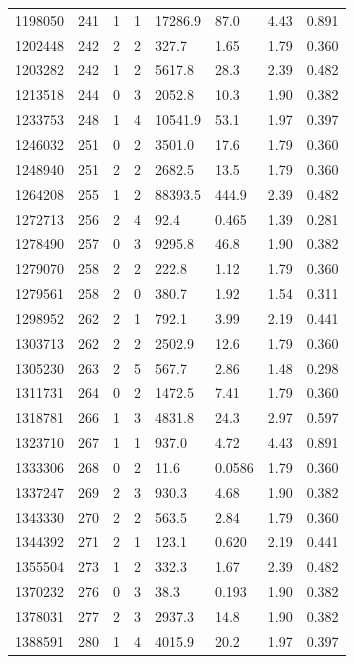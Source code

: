 \documentclass[preview]{standalone}
\begin{document}
{{{{\begin{tabular}{L{1.2cm}C{1.2cm} C{0.3cm}C{0.5cm} C{1.4cm}C{1.4cm} C{1.4cm}C{1.4cm}}
  1198050  &   241  & 1     &  1 &  17286.9  & 87.0  & 4.43 &  0.891   \\ 
  1202448  &   242  & 2     &  2 &  327.7  & 1.65  & 1.79 &  0.360   \\ 
  1203282  &   242  & 1     &  2 &  5617.8  & 28.3  & 2.39 &  0.482   \\ 
  1213518  &   244  & 0     &  3 &  2052.8  & 10.3  & 1.90 &  0.382   \\ 
  1233753  &   248  & 1     &  4 &  10541.9  & 53.1  & 1.97 &  0.397   \\ 
  1246032  &   251  & 0     &  2 &  3501.0  & 17.6  & 1.79 &  0.360   \\ 
  1248940  &   251  & 2     &  2 &  2682.5  & 13.5  & 1.79 &  0.360   \\ 
  1264208  &   255  & 1     &  2 &  88393.5  & 444.9  & 2.39 &  0.482   \\ 
  1272713  &   256  & 2     &  4 &  92.4  & 0.465  & 1.39 &  0.281   \\ 
  1278490  &   257  & 0     &  3 &  9295.8  & 46.8  & 1.90 &  0.382   \\ 
  1279070  &   258  & 2     &  2 &  222.8  & 1.12  & 1.79 &  0.360   \\ 
  1279561  &   258  & 2     &  0 &  380.7  & 1.92  & 1.54 &  0.311   \\ 
  1298952  &   262  & 2     &  1 &  792.1  & 3.99  & 2.19 &  0.441   \\ 
  1303713  &   262  & 2     &  2 &  2502.9  & 12.6  & 1.79 &  0.360   \\ 
  1305230  &   263  & 2     &  5 &  567.7  & 2.86  & 1.48 &  0.298   \\ 
  1311731  &   264  & 0     &  2 &  1472.5  & 7.41  & 1.79 &  0.360   \\ 
  1318781  &   266  & 1     &  3 &  4831.8  & 24.3  & 2.97 &  0.597   \\ 
  1323710  &   267  & 1     &  1 &  937.0  & 4.72  & 4.43 &  0.891   \\ 
  1333306  &   268  & 0     &  2 &  11.6  & 0.0586  & 1.79 &  0.360   \\ 
  1337247  &   269  & 2     &  3 &  930.3  & 4.68  & 1.90 &  0.382   \\ 
  1343330  &   270  & 2     &  2 &  563.5  & 2.84  & 1.79 &  0.360   \\ 
  1344392  &   271  & 2     &  1 &  123.1  & 0.620  & 2.19 &  0.441   \\ 
  1355504  &   273  & 1     &  2 &  332.3  & 1.67  & 2.39 &  0.482   \\ 
  1370232  &   276  & 0     &  3 &  38.3  & 0.193  & 1.90 &  0.382   \\ 
  1378031  &   277  & 2     &  3 &  2937.3  & 14.8  & 1.90 &  0.382   \\ 
  1388591  &   280  & 1     &  4 &  4015.9  & 20.2  & 1.97 &  0.397   \\ 
\hline 
\end{tabular} 

}}}}
\end{document}
